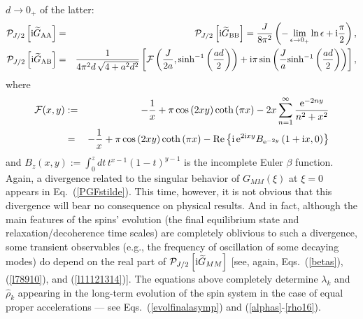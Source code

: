 \documentclass[]{nature}
\begin{document}
{$d\to 0_+$ of the latter:
\begin{eqnarray}
{\cal P}_{J/2}\left[{\rm i}{\widetilde G}_{\rm AA}\right] &=&{\cal P}_{J/2}\left[{\rm i}{\widetilde G}_{\rm BB}\right]=\frac{J}{8\pi^2} 
\left(-
\lim_{\epsilon \to 0_+} \ln\epsilon +{\rm i}\frac{ \pi}{2}\right),
\label{PGFstilde}
\\
{\cal P}_{J/2}\left[{\rm i}{\widetilde G}_{\rm AB}\right]  &=&\frac{1}{4\pi^2d\,\sqrt{4+a^2 d^2}} 
\left[
{\cal F}\left(\frac{J}{2a},{\rm sinh}^{-1}\left(\frac{ad}{2}\right)\right)
+{\rm i}\pi \sin\left(
\frac{J}{a} {\rm sinh^{-1}} \left(\frac{ad}{2}\right)\right)\right],
\label{PGFitilde}
\end{eqnarray}
where
\begin{eqnarray}
{\cal F}(x,y) &:=& -\frac{1}{x}+\pi \cos\left(2xy\right) \coth \left(\pi x\right)-2x\sum_{n=1}^\infty\frac{{\rm e}^{-2ny}}{n^2+x^2}
\nonumber \\
&=&-\frac{1}{x}+\pi \cos\left(2xy\right) \coth \left(\pi x\right)
-{\rm Re}\left\{{\rm i} \,{\rm e}^{2{\rm i}xy}B_{{\rm e}^{-2y}}\left(1+{\rm i}x,0\right)\right\}
\label{calF}
\end{eqnarray}
and $B_z(x,y) := \int_0^z dt\,t^{x-1} (1-t)^{y-1}$ is the incomplete Euler $\beta$ function.
Again,
 a  divergence related to the singular behavior of  $G_{MM}(\xi)$ at $\xi = 0$ appears
in Eq.~(\ref{PGFstilde}). This time, however, it is not obvious that this divergence will bear no consequence on 
physical results. And 
in 
fact, although the main features of the spins' evolution (the final equilibrium state and  relaxation/decoherence time scales) are completely oblivious to such a divergence, some
transient observables (e.g., the frequency of oscillation of some decaying modes) do depend on the real part of 
${\cal P}_{J/2}\left[{\rm i}{\widetilde G}_{MM}\right]$ [see, again, Eqs.~(\ref{betas}), (\ref{l78910}), and (\ref{l11121314})].
The equations above completely determine
$\lambda_k$ and $\hat\rho_k$ appearing in  the long-term 
evolution of the spin system in the case of equal proper accelerations --- see Eqs.~(\ref{evolfinalasymp}) and (\ref{alphas}-\ref{rho16}).


}
\end{document}
